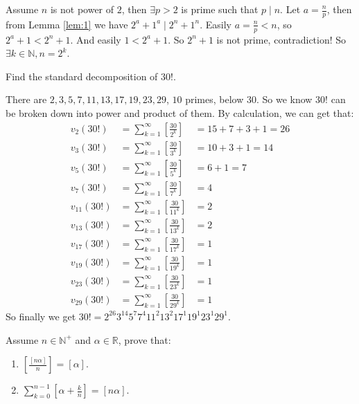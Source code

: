 \documentclass{ctexart}
\begin{document}
\begin{solution}
  Assume \(n\) is not power of \(2\), then \(\exists p>2\) is prime such that \(p \mid n\).
  Let \(a=\frac{n}{p}\), then from Lemma \ref{lem:1} we have \(2^a+1^a \mid 2^n+1^n\).
  Easily \(a=\frac{n}{p}<n\), so \(2^a+1<2^n+1\). And easily \(1<2^a+1\).
  So \(2^n+1\) is not prime, contradiction!
  So \(\exists k \in \mathbb{N},n=2^k\).
\end{solution}
\begin{problem}\label{pro:p16.1}
  Find the standard decomposition of \(30!\).
\end{problem}
\begin{solution}
  There are \(2,3,5,7,11,13,17,19,23,29\), \(10\) primes, below \(30\).
  So we know \(30!\) can be broken down into power and product of them.
  By calculation, we can get that:
  \begin{equation}\label{equ:1}
    \begin{aligned}
      v_2(30!)    & =\sum_{k=1}^{\infty}\left[\frac{30}{2^k}\right]    & =15+7+3+1=26 \\
      v_3(30!)    & =\sum_{k=1}^{\infty}\left[\frac{30}{3^k}\right]    & =10+3+1=14   \\
      v_5(30!)    & =\sum_{k=1}^{\infty}\left[\frac{30}{5^k}\right]    & =6+1=7       \\
      v_7(30!)    & =\sum_{k=1}^{\infty}\left[\frac{30}{7^k}\right]    & =4           \\
      v_{11}(30!) & =\sum_{k=1}^{\infty}\left[\frac{30}{{11}^k}\right] & =2           \\
      v_{13}(30!) & =\sum_{k=1}^{\infty}\left[\frac{30}{{13}^k}\right] & =2           \\
      v_{17}(30!) & =\sum_{k=1}^{\infty}\left[\frac{30}{{17}^k}\right] & =1           \\
      v_{19}(30!) & =\sum_{k=1}^{\infty}\left[\frac{30}{{19}^k}\right] & =1           \\
      v_{23}(30!) & =\sum_{k=1}^{\infty}\left[\frac{30}{{23}^k}\right] & =1           \\
      v_{29}(30!) & =\sum_{k=1}^{\infty}\left[\frac{30}{{29}^k}\right] & =1
    \end{aligned}
  \end{equation}
  So finally we get \(30! = 2^{26} 3^{14} 5^7 7^4 11^2 13^2 17^1 19^1 23^1 29^1\).
\end{solution}
\begin{problem}\label{pro:p16.2}
  Assume \(n \in \mathbb{N}^+\) and \(\alpha \in \mathbb{R}\), prove that:
  \begin{enumerate}
    \item \(\left[\frac{[n \alpha]}{n}\right]=[\alpha]\).
    \item \(\sum_{k=0}^{n-1}[\alpha+\frac{k}{n}]=[n \alpha]\).
  \end{enumerate}
\end{problem}
\end{document}
